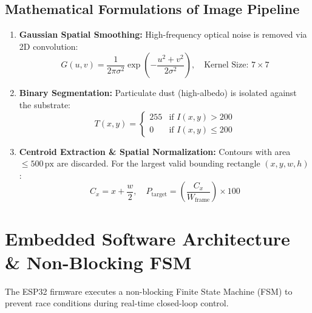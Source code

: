 \documentclass[10pt,a4paper]{article}
\begin{document}
\subsection{Mathematical Formulations of Image Pipeline}
\begin{enumerate}[leftmargin=*]
    \item \textbf{Gaussian Spatial Smoothing:} High-frequency optical noise is removed via 2D convolution:
    \begin{equation}
        G(u, v) = \frac{1}{2\pi \sigma^2} \exp\left(-\frac{u^2 + v^2}{2\sigma^2}\right), \quad \text{Kernel Size: } 7\times 7
    \end{equation}
    \item \textbf{Binary Segmentation:} Particulate dust (high-albedo) is isolated against the substrate:
    \begin{equation}
        T(x,y) = \begin{cases} 255 & \text{if } I(x,y) > 200 \\ 0 & \text{if } I(x,y) \le 200 \end{cases}
    \end{equation}
    \item \textbf{Centroid Extraction \& Spatial Normalization:} Contours with area $\le 500\,\text{px}$ are discarded. For the largest valid bounding rectangle $(x, y, w, h)$:
    \begin{equation}
        C_x = x + \frac{w}{2}, \quad P_{\text{target}} = \left(\frac{C_x}{W_{\text{frame}}}\right) \times 100
    \end{equation}
\end{enumerate}

\clearpage

\section{Embedded Software Architecture \& Non-Blocking FSM}

The ESP32 firmware executes a non-blocking Finite State Machine (FSM) to prevent race conditions during real-time closed-loop control.
\end{document}
